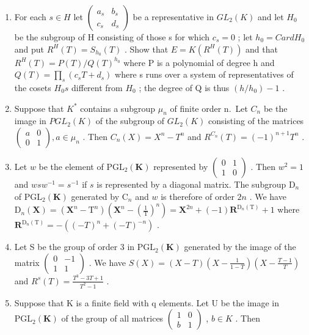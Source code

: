 \begin{enumerate}
\def\labelenumi{\alph{enumi})}
\setcounter{enumi}{1}
\item
  For each \(s \in H\) let \(\begin{pmatrix} a_{s} & b_{s} \\ c_{s} & d_{s} \end{pmatrix}\) be a representative in \(GL_{2}(K)\) and let \(H_{0}\) be the subgroup of H consisting of those s for which \(c_{s} = 0\) ; let \(h_{0} = CardH_{0}\) and put \(R^{H}(T) = S_{h_{0}}(T)\) . Show that \(E = K(R^{H}(T))\) and that \(R^{H}(T) = P(T)/Q(T)^{h_{0}}\) where P is a polynomial of degree h and \(Q(T) = \prod_{s} (c_{s}T + d_{s})\) where s runs over a system of representatives of the cosets \(H_{0}s\) different from \(H_{0}\) ; the degree of Q is thus \((h/h_{0}) - 1\) .
\item
  Suppose that \(K^{*}\) contains a subgroup \(\mu_{n}\) of finite order n.~Let \(C_{n}\) be the image in \(PGL_{2}(K)\) of the subgroup of \(GL_{2}(K)\) consisting of the matrices \(\begin{pmatrix} a & 0 \\ 0 & 1 \end{pmatrix}, a \in \mu_{n}\) . Then \(C_{n}(X) = X^{n} - T^{n}\) and \(R^{C_{n}}(T) = (-1)^{n+1}T^{n}\) .
\item
  Let \(w\) be the element of \(\mathrm{PGL}_2(\mathbf{K})\) represented by \(\begin{pmatrix} 0 & 1 \\ 1 & 0 \end{pmatrix}\) . Then \(w^2 = 1\) and \(wsw^{-1} = s^{-1}\) if \(s\) is represented by a diagonal matrix. The subgroup \(\mathrm{D}_n\) of \(\mathrm{PGL}_2(\mathbf{K})\) generated by \(\mathrm{C}_n\) and \(w\) is therefore of order \(2n\) . We have \(\mathrm{D}_n(\mathbf{X}) = (\mathbf{X}^n - \mathrm{T}^n)\left(\mathbf{X}^n - \left(\frac{1}{\mathrm{T}}\right)^n\right) = \mathbf{X}^{2n} + (-1)\mathbf{R}^{\mathrm{D}_n(\mathrm{T})} + 1\) where \(\mathbf{R}^{\mathrm{D}_n(\mathrm{T})} = -((-T)^n + (-T)^{-n})\) .
\item
  Let S be the group of order 3 in \(\mathrm{PGL}_2(\mathbf{K})\) generated by the image of the matrix \(\left( \begin{array}{cc}0 & -1\\ 1 & 1 \end{array} \right)\) . We have \(S(X) = (X - T)\left(X - \frac{1}{1 - T}\right)\left(X - \frac{T - 1}{T}\right)\) and \(R^s (T) = \frac{T^3 - 3T + 1}{T^2 - 1}\) .
\item
  Suppose that K is a finite field with q elements. Let U be the image in \(\mathrm{PGL}_{2}(\mathbf{K})\) of the group of all matrices \(\begin{pmatrix}1 & 0 \\ b & 1\end{pmatrix}\) , \(b \in K\) . Then
\end{enumerate}

